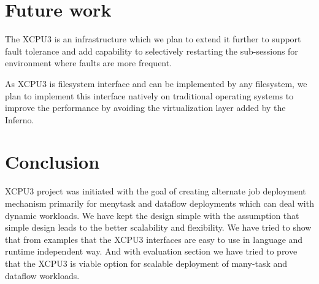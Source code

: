 \documentclass[conference]{IEEEtran}
\begin{document}
\section{Future work}
The XCPU3 is an infrastructure which we plan to extend it further to support
fault tolerance and add capability to selectively restarting the sub-sessions
for environment where faults are more frequent.

As XCPU3 is filesystem interface and can be implemented by any filesystem, we
plan to implement this interface natively on traditional operating systems to
improve the performance by avoiding the virtualization layer added by the
Inferno.

\section{Conclusion}
XCPU3 project was initiated with the goal of creating alternate job deployment
mechanism primarily for menytask and dataflow deployments which can deal with
dynamic workloads. We have kept the design simple with the assumption that
simple design leads to the better scalability and flexibility.  We have tried
to show that from examples that the XCPU3 interfaces are easy to use in
language and runtime independent way. And with evaluation section we have
tried to prove that the XCPU3 is viable option for scalable deployment of
many-task and dataflow workloads.



\end{document}
